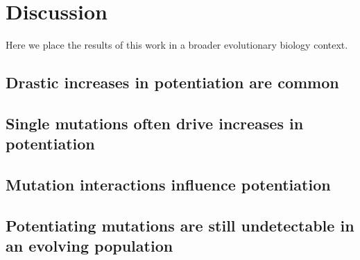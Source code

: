 
\section{Discussion}


Here we place the results of this work in a broader evolutionary biology context. 

\subsection{Drastic increases in potentiation are common}

\subsection{Single mutations often drive increases in potentiation}

\subsection{Mutation interactions influence potentiation}

\subsection{Potentiating mutations are still undetectable in an evolving population}
